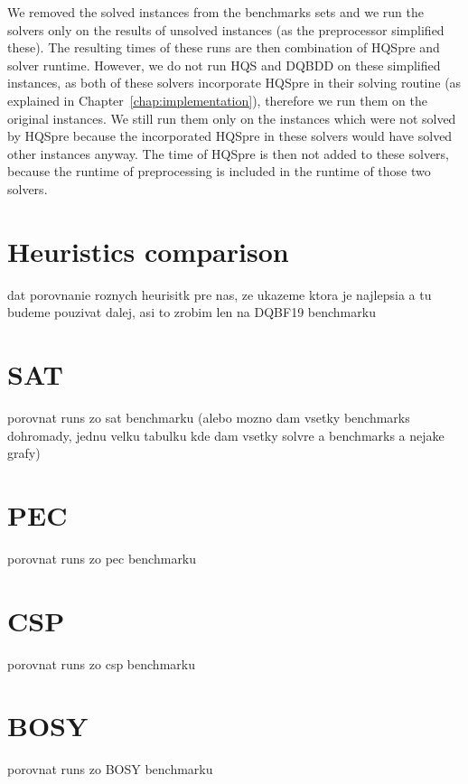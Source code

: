 \documentclass[
  digital, %
  color,
  twoside, %
  table,   %
  nolof,     %
  nolot,     %
]{fithesis3}
\theoremstyle{definition}
\theoremstyle{remark}
\begin{document}
We removed the solved instances from the benchmarks sets and we run the solvers only on the results of unsolved instances (as the preprocessor simplified these). The resulting times of these runs are then combination of HQSpre and solver runtime. However, we do not run HQS and DQBDD on these simplified instances, as both of these solvers incorporate HQSpre in their solving routine (as explained in Chapter~\ref{chap:implementation}), therefore we run them on the original instances. We still run them only on the instances which were not solved by HQSpre because the incorporated HQSpre in these solvers would have solved other instances anyway. The time of HQSpre is then not added to these solvers, because the runtime of preprocessing is included in the runtime of those two solvers.


\section{Heuristics comparison}
dat porovnanie roznych heurisitk pre nas, ze ukazeme ktora je najlepsia a tu budeme pouzivat dalej, asi to zrobim len na DQBF19 benchmarku

\section{SAT}
porovnat runs zo sat benchmarku (alebo mozno dam vsetky benchmarks dohromady, jednu velku tabulku kde dam vsetky solvre a benchmarks a nejake grafy)

\section{PEC}
porovnat runs zo pec benchmarku

\section{CSP}
porovnat runs zo csp benchmarku

\section{BOSY}
porovnat runs zo BOSY benchmarku
\end{document}
